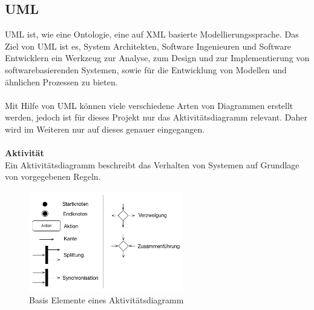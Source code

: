 \subsection{\ac{UML}}
\ac{UML} ist, wie eine Ontologie, eine auf \ac{XML} basierte Modellierungssprache.
Das Ziel von \ac{UML} ist es, System Architekten, Software Ingenieuren und Software Entwicklern ein Werkzeug zur Analyse, zum Design und zur Implementierung von softwarebasierenden Systemen, sowie für die Entwicklung von Modellen und ähnlichen Prozessen zu bieten.\\
\\
Mit Hilfe von \ac{UML} können viele verschiedene Arten von Diagrammen erstellt werden, jedoch ist für dieses Projekt nur das Aktivitätsdiagramm relevant. Daher wird im Weiteren nur auf dieses genauer eingegangen.\\
\\
\textbf{Aktivität}\\
Ein Aktivitätsdiagramm beschreibt das Verhalten von Systemen auf Grundlage von vorgegebenen Regeln. \\

\begin{figure}[hbt!]
 \centering
  \includegraphics[width=0.6\textwidth]{graphics/stateoftheart/Activity_Elemente}
  \caption{Basis Elemente eines Aktivitätsdiagramm \cite{activity_list}}
\end{figure}

